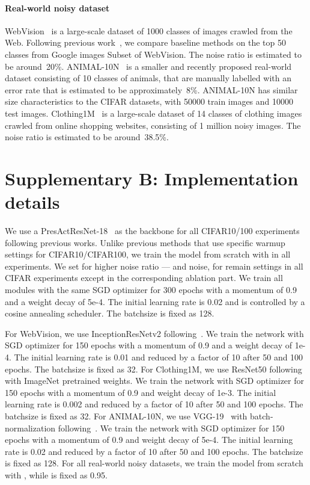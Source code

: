 \documentclass{bmvc2k}
\begin{document}
\paragraph{Real-world noisy dataset}
WebVision~\citep{webvision} is a large-scale dataset of 1000 classes of images crawled from the Web. Following previous work~\citep{mentornet, dividemix, moit}, we compare baseline methods on the top 50 classes from Google images Subset of WebVision. The noise ratio is estimated to be around~20\%. 
ANIMAL-10N~\citep{selfie} is a smaller and recently proposed real-world dataset consisting of 10 classes of animals, that are manually labelled with an error rate that is estimated to be approximately~8\%. ANIMAL-10N has similar size characteristics to the CIFAR datasets, with 50000 train images and 10000 test images.
Clothing1M~\citep{clothing1mdataset} is a large-scale dataset of 14 classes of clothing images crawled from online shopping websites, consisting of 1 million noisy images. The noise ratio is estimated to be around~38.5\%. 

\section*{Supplementary B: Implementation details}
\label{sup:b}
We use a PresActResNet-18~\citep{preactresnet} as the backbone for all CIFAR10/100 experiments following previous works. Unlike previous methods that use specific warmup settings for CIFAR10/CIFAR100, we train the model from scratch with  in all experiments. We set  for higher noise ratio ---  and  noise,  for remain settings in all CIFAR experiments except in the corresponding ablation part. We train all modules with the same SGD optimizer for 300 epochs with a momentum of 0.9 and a weight decay of 5e-4. The initial learning rate is 0.02 and is controlled by a cosine annealing scheduler. The batchsize is fixed as 128. 

For WebVision, we use InceptionResNetv2 following~\citep{dividemix}. We train the network with SGD optimizer for 150 epochs with a momentum of 0.9 and a weight decay of 1e-4. The initial learning rate is 0.01 and reduced by a factor of 10 after 50 and 100 epochs. The batchsize is fixed as 32. 
For Clothing1M, we use ResNet50 following~\citep{dividemix} with ImageNet pretrained weights. We train the network with SGD optimizer for 150 epochs with a momentum of 0.9 and weight decay of 1e-3. The initial learning rate is 0.002 and reduced by a factor of 10 after 50 and 100 epochs. The batchsize is fixed as 32. 
For ANIMAL-10N, we use VGG-19~\citep{vgg19} with batch-normalization following~\citep{selfie}. We train the network with SGD optimizer for 150 epochs with a momentum of 0.9 and weight decay of 5e-4. The initial learning rate is 0.02 and reduced by a factor of 10 after 50 and 100 epochs. The batchsize is fixed as 128. For all real-world noisy datasets, we train the model from scratch with , while  is fixed as 0.95.
\end{document}
